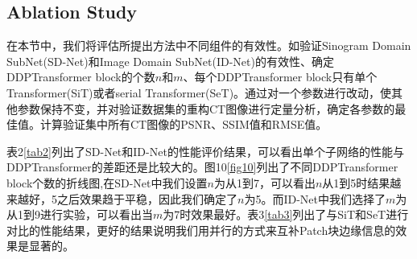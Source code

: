 \subsection{Ablation Study}
在本节中，我们将评估所提出方法中不同组件的有效性。如验证Sinogram Domain SubNet(SD-Net)和Image Domain SubNet(ID-Net)的有效性、确定DDPTransformer block的个数$n$和$m$、每个DDPTransformer block只有单个Transformer(SiT)或者serial Transformer(SeT)。通过对一个参数进行改动，使其他参数保持不变，并对验证数据集的重构CT图像进行定量分析，确定各参数的最佳值。计算验证集中所有CT图像的PSNR、SSIM值和RMSE值。\par
表2\ref{tab2}列出了SD-Net和ID-Net的性能评价结果，可以看出单个子网络的性能与DDPTransformer的差距还是比较大的。图10\ref{fig10}列出了不同DDPTransformer block个数的折线图,在SD-Net中我们设置$n$为从1到7，可以看出$n$从1到5时结果越来越好，5之后效果趋于平稳，因此我们确定了$n$为5。而ID-Net中我们选择了$m$为从1到9进行实验，可以看出当$m$为7时效果最好。表3\ref{tab3}列出了与SiT和SeT进行对比的性能结果，更好的结果说明我们用并行的方式来互补Patch块边缘信息的效果是显著的。\par
\begin{table}[H]
	\centering
	\caption{子网络的性能评价结果(均值$\pm$方差),最好的值用红色标出。}
	\label{tab2}
\end{table}
